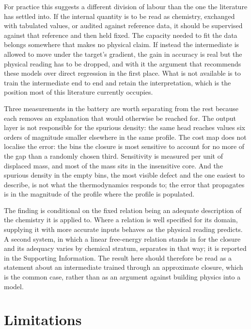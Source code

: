 For practice this suggests a different division of labour than the one the literature has settled
into. If the internal quantity is to be read as chemistry, exchanged with tabulated values, or
audited against reference data, it should be supervised against that reference and then held
fixed. The capacity needed to fit the data belongs somewhere that makes no physical claim. If
instead the intermediate is allowed to move under the target's gradient, the gain in accuracy is
real but the physical reading has to be dropped, and with it the argument that recommends these
models over direct regression in the first place. What is not available is to train the
intermediate end to end and retain the interpretation, which is the position most of this
literature currently occupies.

Three measurements in the battery are worth separating from the rest because each removes an
explanation that would otherwise be reached for. The output layer is not responsible for the
spurious density: the same head reaches values six orders of magnitude smaller elsewhere in the
same profile. The cost map does not localise the error: the bins the closure is most sensitive to
account for no more of the gap than a randomly chosen third. Sensitivity is measured per unit of
displaced mass, and most of the mass sits in the insensitive core. And the spurious density in the
empty bins, the most visible defect and the one easiest to describe, is not what the
thermodynamics responds to; the error that propagates is in the magnitude of the profile where the
profile is populated.

The finding is conditional on the fixed relation being an adequate description of the chemistry it
is applied to. Where a relation is well specified for its domain, supplying it with more accurate
inputs behaves as the physical reading predicts. A second system, in which a linear free-energy
relation stands in for the closure and its adequacy varies by chemical stratum, separates in that
way; it is reported in the Supporting Information. The result here should therefore be read as a
statement about an intermediate trained through an approximate closure, which is the common case,
rather than as an argument against building physics into a model.

\section{Limitations}
\label{sec:limitations}

